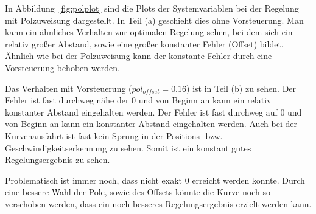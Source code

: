 In Abbildung~\ref{fig:polplot} sind die Plots der Systemvariablen bei der
Regelung mit Polzuweisung dargestellt. In Teil (a) geschieht dies ohne
Vorsteuerung. Man kann ein ähnliches Verhalten zur optimalen Regelung
sehen, bei dem sich ein relativ großer Abstand, sowie eine großer konstanter
Fehler (Offset) bildet. Ähnlich wie bei der Polzuweisung kann der konstante
Fehler durch eine Vorsteuerung behoben werden.

Das Verhalten mit Vorsteuerung ($pol_{offset} = 0.16$) ist in Teil (b) zu sehen.
Der Fehler ist fast durchweg nähe der 0 und von Beginn an kann ein relativ
konstanter Abstand eingehalten werden. Der Fehler ist fast durchweg auf 0 und
von Beginn an kann ein konstanter Abstand eingehalten werden. Auch bei der
Kurvenausfahrt ist fast kein Sprung in der Positions- bzw.
Geschwindigkeitserkennung zu sehen.  Somit ist ein konstant gutes
Regelungsergebnis zu sehen. 

Problematisch ist immer noch, dass nicht exakt 0 erreicht werden konnte. Durch
eine bessere Wahl der Pole, sowie des Offsets könnte die Kurve noch so
verschoben werden, dass ein noch besseres Regelungsergebnis erzielt werden
kann.


